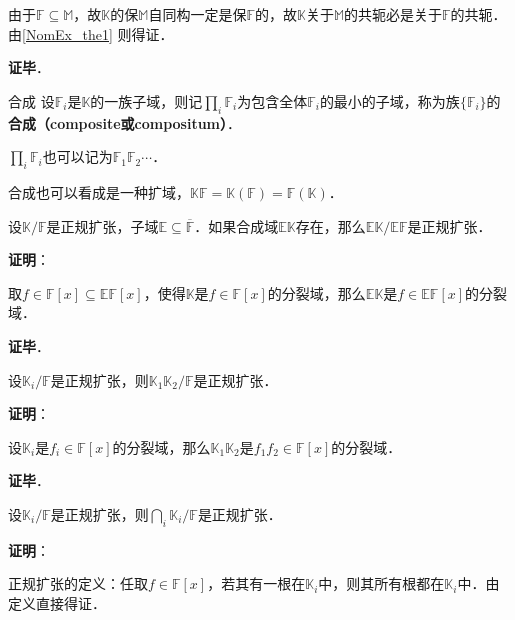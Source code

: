 
由于$\mathbb{F}\subseteq\mathbb{M}$，故$\mathbb{K}$的保$\mathbb{M}$自同构一定是保$\mathbb{F}$的，故$\mathbb{K}$关于$\mathbb{M}$的共轭必是关于$\mathbb{F}$的共轭．由\autoref{NomEx_the1} 则得证．

\textbf{证毕}．





\begin{definition}{合成}
设$\mathbb{F}_i$是$\mathbb{K}$的一族子域，则记$\prod_{i}\mathbb{F}_i$为包含全体$\mathbb{F}_i$的最小的子域，称为族$\{\mathbb{F}_i\}$的\textbf{合成（composite或compositum）}．

$\prod_{i}\mathbb{F}_i$也可以记为$\mathbb{F}_1\mathbb{F}_2\cdots$．
\end{definition}


合成也可以看成是一种扩域，$\mathbb{K}\mathbb{F}=\mathbb{K}(\mathbb{F})=\mathbb{F}(\mathbb{K})$．


\begin{theorem}{}
设$\mathbb{K}/\mathbb{F}$是正规扩张，子域$\mathbb{E}\subseteq\overline{\mathbb{F}}$．如果合成域$\mathbb{EK}$存在，那么$\mathbb{EK}/\mathbb{EF}$是正规扩张．
\end{theorem}

\textbf{证明}：

取$f\in\mathbb{F}[x]\subseteq\mathbb{EF}[x]$，使得$\mathbb{K}$是$f\in\mathbb{F}[x]$的分裂域，那么$\mathbb{EK}$是$f\in\mathbb{EF}[x]$的分裂域．

\textbf{证毕}．






\begin{theorem}{}
设$\mathbb{K}_i/\mathbb{F}$是正规扩张，则$\mathbb{K}_1\mathbb{K}_2/\mathbb{F}$是正规扩张．
\end{theorem}


\textbf{证明}：

设$\mathbb{K}_i$是$f_i\in\mathbb{F}[x]$的分裂域，那么$\mathbb{K}_1\mathbb{K}_2$是$f_1f_2\in\mathbb{F}[x]$的分裂域．

\textbf{证毕}．


\begin{theorem}{}\label{NomEx_the2}
设$\mathbb{K}_i/\mathbb{F}$是正规扩张，则$\bigcap_{i}\mathbb{K}_i/\mathbb{F}$是正规扩张．
\end{theorem}

\textbf{证明}：

正规扩张的定义：任取$f\in\mathbb{F}[x]$，若其有一根在$\mathbb{K}_i$中，则其所有根都在$\mathbb{K}_i$中．由定义直接得证．

